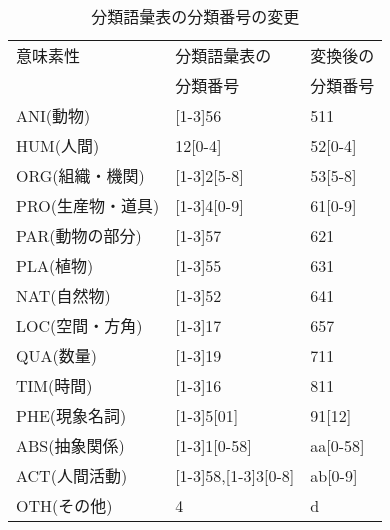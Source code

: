 \begin{table}[t]
    \caption{分類語彙表の分類番号の変更}
    \label{tab:bunrui_code_change}
  \begin{center}
\small\renewcommand{\arraystretch}{}
\begin{tabular}[c]{|l|l|l|}\hline
     意味素性          & 分類語彙表の        & 変換後の\\
                       &   分類番号          & 分類番号\\\hline
     ANI(動物)         &  [1-3]56                & 511\\
     HUM(人間)         &  12[0-4]            & 52[0-4]\\
     ORG(組織・機関)   &  [1-3]2[5-8]        & 53[5-8]\\
     PRO(生産物・道具) &  [1-3]4[0-9]            & 61[0-9]\\
     PAR(動物の部分)   &  [1-3]57                & 621\\
     PLA(植物)         &  [1-3]55                & 631\\
     NAT(自然物)       &  [1-3]52                & 641\\
     LOC(空間・方角)   &  [1-3]17                & 657\\
     QUA(数量)         &  [1-3]19                & 711\\
     TIM(時間)         &  [1-3]16                & 811\\
     PHE(現象名詞)     &  [1-3]5[01]            & 91[12]\\
     ABS(抽象関係)     &  [1-3]1[0-58]           & aa[0-58]\\
     ACT(人間活動)     &  [1-3]58,[1-3]3[0-8]        & ab[0-9]\\
     OTH(その他)       &  4                  & d\\\hline
\end{tabular}
\end{center}
\end{table}

